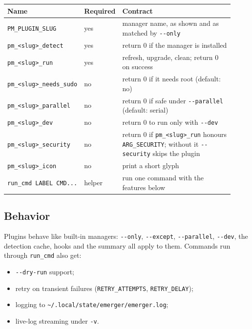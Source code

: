 \documentclass[11pt,a4paper]{article}
\begin{document}
\begin{center}
\begin{longtable}{@{}p{0.30\linewidth} p{0.12\linewidth} p{0.50\linewidth}@{}}
\toprule
\textbf{Name} & \textbf{Required} & \textbf{Contract} \\
\midrule \endhead
\verb|PM_PLUGIN_SLUG|       & yes & manager name, as shown and as matched by \texttt{-{}-only} \\
\verb|pm_<slug>_detect|     & yes & return 0 if the manager is installed \\
\verb|pm_<slug>_run|        & yes & refresh, upgrade, clean; return 0 on success \\
\verb|pm_<slug>_needs_sudo| & no  & return 0 if it needs root (default: no) \\
\verb|pm_<slug>_parallel|   & no  & return 0 if safe under \texttt{-{}-parallel} (default: serial) \\
\verb|pm_<slug>_dev|        & no  & return 0 to run only with \texttt{-{}-dev} \\
\verb|pm_<slug>_security|   & no  & return 0 if \verb|pm_<slug>_run| honours \verb|ARG_SECURITY|; without it \texttt{-{}-security} skips the plugin \\
\verb|pm_<slug>_icon|       & no  & print a short glyph \\
\verb|run_cmd LABEL CMD...| & helper & run one command with the features below \\
\bottomrule
\end{longtable}
\end{center}

\subsection{Behavior}
Plugins behave like built-in managers: \texttt{-{}-only},
\texttt{-{}-except}, \texttt{-{}-parallel}, \texttt{-{}-dev}, the detection
cache, hooks and the summary all apply to them. Commands run through
\texttt{run\_cmd} also get:

\begin{itemize}
  \item \texttt{-{}-dry-run} support;
  \item retry on transient failures (\texttt{RETRY\_ATTEMPTS}, \texttt{RETRY\_DELAY});
  \item logging to \verb|~/.local/state/emerger/emerger.log|;
  \item live-log streaming under \texttt{-v}.
\end{itemize}
\end{document}
